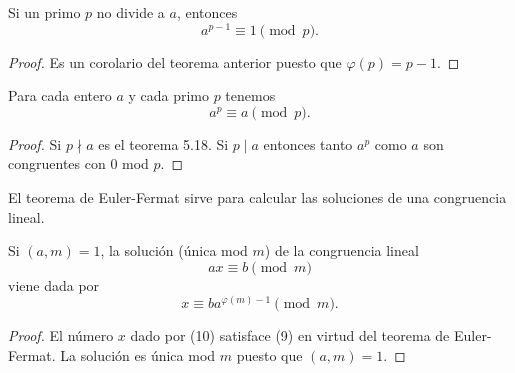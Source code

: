 \documentclass[12pt,a4paper]{book}
\begin{document}
    \begin{teorema}
        Si un primo $p$ no divide a $a$, entonces
        \begin{equation*}
            a^{p-1}\equiv1\pmod{p}.
        \end{equation*}
    \end{teorema}

    \begin{proof}
        Es un corolario del teorema anterior puesto que $\varphi(p)=p-1$.
    \end{proof}

    \begin{teorema}
        Para cada entero $a$ y cada primo $p$ tenemos
        \begin{equation*}
            a^{p}\equiv a\pmod{p}.
        \end{equation*}
    \end{teorema}

    \begin{proof}
        Si $p\nmid a$ es el teorema 5.18. Si $p\mid a$ entonces tanto $a^{p}$ como $a$ son
        congruentes con 0 mod $p$.
    \end{proof}

    El teorema de Euler-Fermat sirve para calcular las soluciones de una congruencia
    lineal.

    \begin{teorema}
        Si $(a,m)=1$, la solución (única mod $m$) de la congruencia lineal
        \begin{equation}
            ax\equiv b\pmod{m}
        \end{equation}
        viene dada por
        \begin{equation}
            x\equiv ba^{\varphi(m)-1}\pmod{m}.
        \end{equation}
    \end{teorema}

    \begin{proof}
        El número $x$ dado por (10) satisface (9) en virtud del teorema de Euler-Fermat.
        La solución es única mod $m$ puesto que $(a,m)=1$.
    \end{proof}
\end{document}
